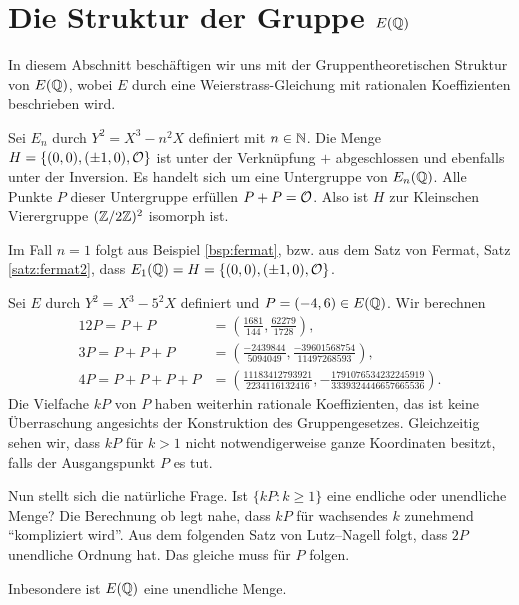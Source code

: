 \section{Die Struktur der Gruppe $E({\mathbb{Q}})$}

In diesem Abschnitt beschäftigen wir uns mit der Gruppentheoretischen
Struktur von $E({\mathbb{Q}})$, wobei $E$ durch eine Weierstrass-Gleichung mit
rationalen Koeffizienten beschrieben wird. 


\begin{beispiel}
  \label{bsp:vierergruppe}
  Sei $E_n$ durch $Y^2 = X^3-n^2 X$ definiert mit $n\in{\mathbb{N}}$.
  Die Menge $H=\{(0,0),(\pm 1,0),{\mathcal O}\}$ ist unter der Verknüpfung $+$
  abgeschlossen
  und ebenfalls unter der Inversion.
  Es handelt sich um eine Untergruppe von $E_n({\mathbb{Q}})$.
  Alle
  Punkte $P$ dieser Untergruppe erfüllen $P+P={\mathcal O}$.  Also ist $H$ zur
  Kleinschen Vierergruppe $({\mathbb{Z}}/2{\mathbb{Z}})^2$ isomorph ist.
  
  Im Fall $n=1$ folgt aus Beispiel \ref{bsp:fermat}, bzw. aus dem Satz von Fermat, Satz
  \ref{satz:fermat2}, dass $E_1({\mathbb{Q}}) = H=  \{(0,0),(\pm 1,0),{\mathcal O}\}$. 
\end{beispiel}

\begin{beispiel}
  Sei $E$ durch $Y^2 = X^3-5^2X$ definiert und $P = (-4,6) \in
  E({\mathbb{Q}})$.
  Wir berechnen
  \begin{alignat*}1
    2P=P+P &= \left(\frac{1681}{144}, \frac{62279}{1728}\right),\\
    3P=P+P +P &= \left(\frac{-2439844}{5094049}, \frac{-39601568754}{11497268593} \right),\\
    4P= P+P +P+P &= \left( \frac{11183412793921}{2234116132416}, -\frac{1791076534232245919}{3339324446657665536}\right).
  \end{alignat*}
  Die Vielfache $kP$ von $P$ haben weiterhin rationale Koeffizienten,
  das ist keine Überraschung angesichts der Konstruktion des
  Gruppengesetzes. Gleichzeitig sehen wir, dass $kP$ für $k>1$ nicht
  notwendigerweise ganze Koordinaten besitzt, falls der Ausgangspunkt $P$
  es tut.

  Nun stellt sich die natürliche Frage. Ist $\{ kP : k\ge 1\}$ eine
  endliche oder unendliche Menge? Die Berechnung ob legt nahe, dass
  $kP$ für wachsendes $k$ zunehmend ``kompliziert wird''.
  Aus dem folgenden Satz von Lutz--Nagell folgt, dass $2P$ unendliche
  Ordnung hat. Das gleiche muss für $P$ folgen.

  Inbesondere ist $E({\mathbb{Q}})$ eine unendliche Menge. 
\end{beispiel}

